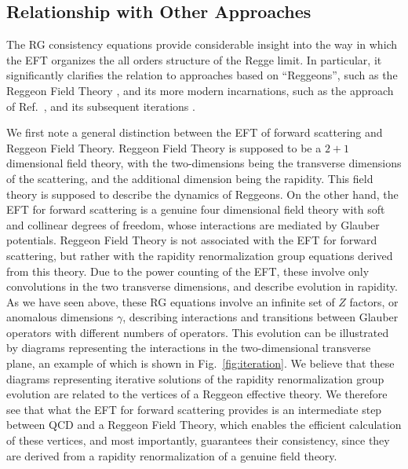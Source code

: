 \documentclass[letterpaper,11pt]{article}
\DeclareRobustCommand{\Fig}[1]{Fig.~\ref{#1}}
\begin{document}
\subsection{Relationship with Other Approaches}\label{sec:relate}

The RG consistency equations provide considerable insight into the way in which the EFT organizes the all orders structure of the Regge limit. In particular, it significantly clarifies the relation to approaches based on ``Reggeons'', such as the Reggeon Field Theory \cite{Gribov:1968fc,Abarbanel:1975me,Baker:1976cv}, and its more modern incarnations, such as the approach of Ref.~\cite{Caron-Huot:2013fea}, and its subsequent iterations \cite{Caron-Huot:2017fxr,Falcioni:2020lvv,Falcioni:2021buo,Falcioni:2021dgr,Caola:2021izf}.

We first note a general distinction between the EFT of forward scattering and Reggeon Field Theory. Reggeon Field Theory is supposed to be a $2+1$ dimensional field theory, with the two-dimensions being the transverse dimensions of the scattering, and the additional dimension being the rapidity. This field theory is supposed to describe the dynamics of Reggeons. On the other hand, the EFT for forward scattering is a genuine four dimensional field theory with soft and collinear degrees of freedom, whose interactions are mediated by Glauber potentials.  Reggeon Field Theory is not associated with the EFT for forward scattering, but rather with the rapidity renormalization group equations derived from this theory. Due to the power counting of the EFT, these involve only convolutions in the two transverse dimensions, and describe evolution in rapidity. As we have seen above, these RG equations involve an infinite set of $Z$ factors, or anomalous dimensions $\gamma$, describing interactions and transitions between Glauber operators with different numbers of operators. This evolution can be illustrated by diagrams representing the interactions in the two-dimensional transverse plane, an example of which is shown in \Fig{fig:iteration}. We believe that these diagrams representing iterative solutions of the rapidity renormalization group evolution are related to the vertices of a Reggeon effective theory.  We therefore see that what the EFT for forward scattering provides is an intermediate step between QCD and a Reggeon Field Theory, which enables the efficient calculation of these vertices, and most importantly, guarantees their consistency, since they are derived from a rapidity renormalization of a genuine field theory.
\end{document}
